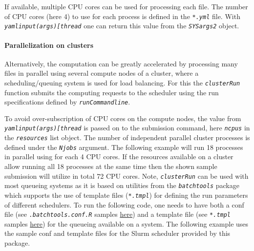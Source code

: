 \documentclass[14pt,]{article}
\begin{document}
If available, multiple CPU cores can be used for processing each file. The number
of CPU cores (here 4) to use for each process is defined in the \emph{\texttt{*.yml}} file.
With \emph{\texttt{yamlinput(args){[}\textquotesingle{}thread\textquotesingle{}{]}}} one can return this value from the \emph{\texttt{SYSargs2}} object.

\hypertarget{parallelization-on-clusters-1}{%
\paragraph{Parallelization on clusters}\label{parallelization-on-clusters-1}}

Alternatively, the computation can be greatly accelerated by processing many files
in parallel using several compute nodes of a cluster, where a scheduling/queuing
system is used for load balancing. For this the \emph{\texttt{clusterRun}} function submits
the computing requests to the scheduler using the run specifications
defined by \emph{\texttt{runCommandline}}.

To avoid over-subscription of CPU cores on the compute nodes, the value from
\emph{\texttt{yamlinput(args){[}\textquotesingle{}thread\textquotesingle{}{]}}} is passed on to the submission command, here \emph{\texttt{ncpus}}
in the \emph{\texttt{resources}} list object. The number of independent parallel cluster
processes is defined under the \emph{\texttt{Njobs}} argument. The following example will run
18 processes in parallel using for each 4 CPU cores. If the resources available
on a cluster allow running all 18 processes at the same time then the shown sample
submission will utilize in total 72 CPU cores. Note, \emph{\texttt{clusterRun}} can be used
with most queueing systems as it is based on utilities from the \emph{\texttt{batchtools}}
package which supports the use of template files (\emph{\texttt{*.tmpl}}) for defining the
run parameters of different schedulers. To run the following code, one needs to
have both a conf file (see \emph{\texttt{.batchtools.conf.R}} samples \href{https://mllg.github.io/batchtools/}{here})
and a template file (see \emph{\texttt{*.tmpl}} samples \href{https://github.com/mllg/batchtools/tree/master/inst/templates}{here})
for the queueing available on a system. The following example uses the sample
conf and template files for the Slurm scheduler provided by this package.
\end{document}
